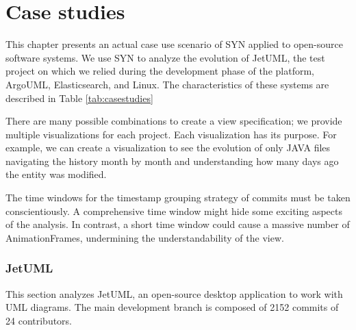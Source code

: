 
\chapter[Case studies]{Case studies}
\graphicspath{ {images/casestudies} }

This chapter presents an actual case use scenario of SYN applied to open-source software systems. 
We use SYN to analyze the evolution of JetUML, the test project on which we relied during the development phase of the platform, ArgoUML, Elasticsearch, and Linux. 
The characteristics of these systems are described in Table \ref{tab:casestudies}



\bigbreak
There are many possible combinations to create a view specification; we provide multiple visualizations for each project. 
Each visualization has its purpose. For example, we can create a visualization to see the evolution of only JAVA files navigating the history 
month by month and understanding how many days ago the entity was modified. 

The time windows for the timestamp grouping strategy of commits must be taken conscientiously. 
A comprehensive time window might hide some exciting aspects of the analysis. In contrast, a short time window could cause a massive number of AnimationFrames, undermining the understandability of the view. 


\subsection*{JetUML}
This section analyzes JetUML, an open-source desktop application to work with UML diagrams.
The main development branch is composed of 2152 commits of 24 contributors. 
\newpage
